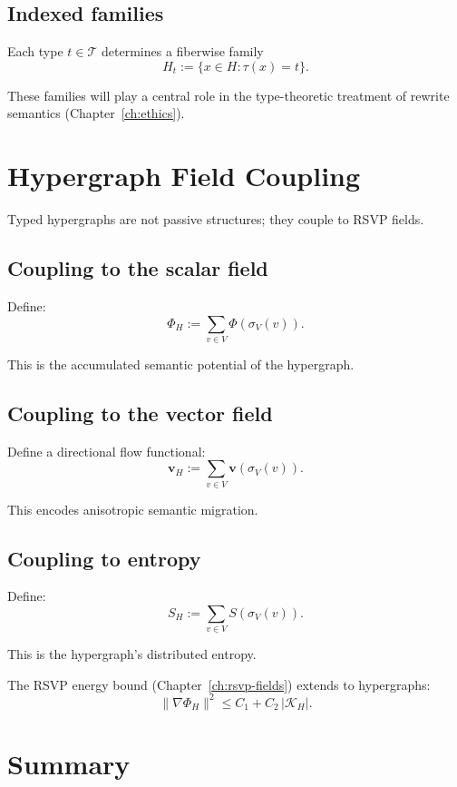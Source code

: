 \subsection{Indexed families}

Each type $t\in\mathcal{T}$ determines a fiberwise family
\[
H_t := \{ x\in H : \tau(x) = t \}.
\]

These families will play a central role in the type-theoretic treatment of
rewrite semantics (Chapter~\ref{ch:ethics}).

\section{Hypergraph Field Coupling}

Typed hypergraphs are not passive structures; they couple to RSVP fields.

\subsection{Coupling to the scalar field}

Define:
\[
\Phi_H := \sum_{v\in V} \Phi(\sigma_V(v)).
\]

This is the accumulated semantic potential of the hypergraph.

\subsection{Coupling to the vector field}

Define a directional flow functional:
\[
\mathbf{v}_H := \sum_{v\in V} \mathbf{v}(\sigma_V(v)).
\]

This encodes anisotropic semantic migration.

\subsection{Coupling to entropy}

Define:
\[
S_H := \sum_{v\in V} S(\sigma_V(v)).
\]

This is the hypergraph’s distributed entropy.

\begin{proposition}
The RSVP energy bound (Chapter~\ref{ch:rsvp-fields}) extends to hypergraphs:
\[
\|\nabla \Phi_H\|^2
\le
C_1 + C_2\,|\mathcal{K}_H|.
\]
\end{proposition}

\section{Summary}

